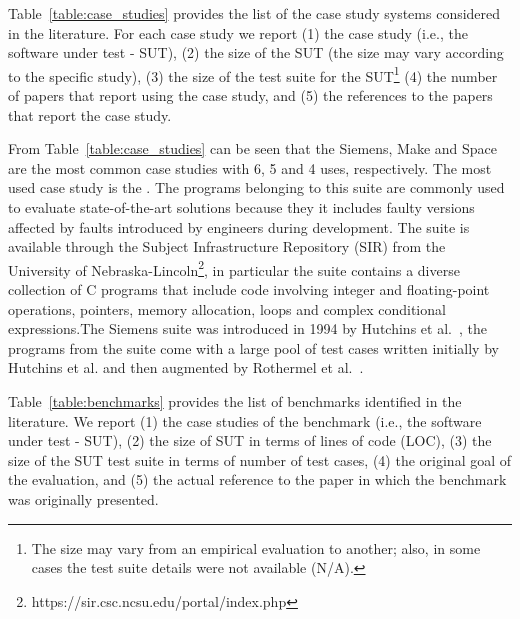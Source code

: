 



Table~\ref{table:case_studies} provides the list of the case study systems considered in the literature. For each case study we report (1) the case study (i.e., the software under test - SUT), (2) the size of the SUT (the size may vary according to the specific study), (3) the size of the test suite for the SUT\footnote{The size may vary from an empirical evaluation to another; also, in some cases the test suite details were not available (N/A).} (4) the number of papers that report using the case study, and (5) the references to the papers that report the case study.


From Table~\ref{table:case_studies} can be seen that the Siemens, Make and Space are the most common case studies with 6, 5 and 4 uses, respectively. 
The most used case study is the . The programs belonging to this suite are commonly used to evaluate state-of-the-art solutions because they it includes faulty versions affected by faults introduced by engineers during development. The suite is available through the Subject Infrastructure Repository (SIR) from the University of Nebraska-Lincoln\footnote{https://sir.csc.ncsu.edu/portal/index.php}, in particular the suite contains a diverse collection of C programs that include code involving integer and floating-point operations, pointers, memory allocation, loops and complex conditional expressions.The Siemens suite was introduced in 1994 by Hutchins et al.~\cite{hutchins1994experiments}, the programs from the suite come with a large pool of test cases written initially by Hutchins et al. and then augmented by Rothermel et al.~\cite{rothermel1998empirical}.

Table~\ref{table:benchmarks} provides the list of benchmarks identified in the literature. We report (1) the case studies of the benchmark (i.e., the software under test - SUT), (2) the size of SUT in terms of lines of code (LOC), (3) the size of the SUT test suite in terms of number of test cases, (4) the original goal of the evaluation, and (5) the actual reference to the paper in which the benchmark was originally presented. 



